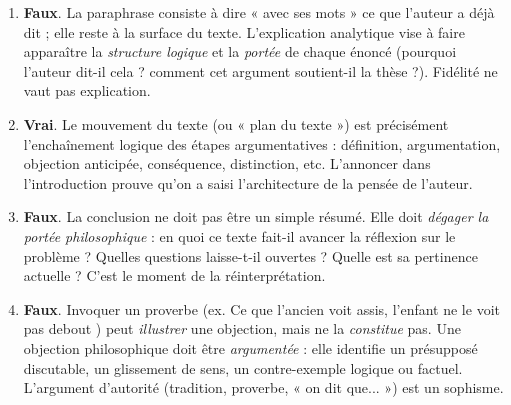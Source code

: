 \documentclass[11pt]{article}
\newcommand{\cle}[1]{{\popxbold\color{popdark}#1}}
\begin{document}
\begin{corrige}
\begin{enumerate}
\item \textbf{Faux}. La \cle{paraphrase} consiste à dire « avec ses mots » ce que l'auteur a déjà dit ; elle reste à la surface du texte. L'\cle{explication analytique} vise à faire apparaître la \emph{structure logique} et la \emph{portée} de chaque énoncé (pourquoi l'auteur dit-il cela ? comment cet argument soutient-il la thèse ?). Fidélité ne vaut pas explication.
\item \textbf{Vrai}. Le \cle{mouvement du texte} (ou « plan du texte ») est précisément l'enchaînement logique des étapes argumentatives : définition, argumentation, objection anticipée, conséquence, distinction, etc. L'annoncer dans l'introduction prouve qu'on a saisi l'architecture de la pensée de l'auteur.
\item \textbf{Faux}. La conclusion ne doit pas être un simple résumé. Elle doit \emph{dégager la portée philosophique} : en quoi ce texte fait-il avancer la réflexion sur le problème ? Quelles questions laisse-t-il ouvertes ? Quelle est sa pertinence actuelle ? C'est le moment de la \cle{réinterprétation}.
\item \textbf{Faux}. Invoquer un proverbe (ex. \guillemotleft Ce que l'ancien voit assis, l'enfant ne le voit pas debout \guillemotright) peut \emph{illustrer} une objection, mais ne la \emph{constitue} pas. Une objection philosophique doit être \emph{argumentée} : elle identifie un présupposé discutable, un glissement de sens, un contre-exemple logique ou factuel. L'argument d'autorité (tradition, proverbe, « on dit que... ») est un sophisme.
\end{enumerate}
\end{corrige}
\end{document}
